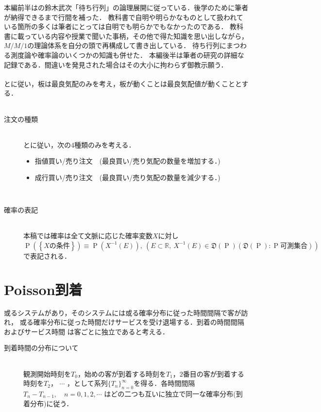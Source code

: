 \documentclass[a4j,papersize,disablejfam,slide,14pt]{jsarticle}
\def\prob#1{\operatorname{P} \left(\left\{ #1 \right\}\right)} %
\begin{document}
    本編前半は\cite{suzuki_queueing}の鈴木武次「待ち行列」の論理展開に従っている．後学のために筆者が納得できるまで行間を補った．
    教科書で自明や明らかなものとして扱われている箇所の多くは筆者にとっては自明でも明らかでもなかったのである．
    教科書に載っている内容や授業で聞いた事柄，その他で得た知識を思い出しながら，$M/M/1$の理論体系を自分の頭で再構成して書き出している．
    待ち行列にまつわる測度論や確率論のいくつかの知識も併せた．
    本編後半は筆者の研究の詳細な記録である．間違いを発見された場合はその大小に拘わらず御教示願う．\\
    \mbox{}\\
    \cite{endo_zuo_kishimoto}と\cite{li_hui_endo_kishimoto}に従い，板は最良気配のみを考え，板が動くことは最良気配値が動くこととする．\\
    \mbox{}\\
    \begin{description}
    	\item[注文の種類]\mbox{}\\
     	\cite{endo_zuo_kishimoto}と\cite{li_hui_endo_kishimoto}に従い，次の4種類のみを考える．
    	\begin{itemize}
    		\item 指値買い/売り注文　(最良買い/売り気配の数量を増加する．)
        	\item 成行買い/売り注文　(最良買い/売り気配の数量を減少する．)
    	\end{itemize}
        \mbox{}\\
        \item[確率の表記]\mbox{}\\
        	本稿では確率は全て文脈に応じた確率変数$X$に対し$\prob{\mbox{$X$の条件}} \equiv \operatorname{P}(X^{-1}(E)),
            \ (E \subset \mathbb{R},\ X^{-1}(E) \in \mathfrak{D}(\operatorname{P})(\mathfrak{D}(\operatorname{P}):\operatorname{P}\mbox{可測集合}))$で表記される．
     \end{description}

\section{{\rm Poisson}到着}
    \begin{screen}
    或るシステムがあり，そのシステムには或る確率分布に従った時間間隔で客が訪れ，
    或る確率分布に従った時間だけサービスを受け退場する．到着の時間間隔およびサービス時間
    は客ごとに独立であると考える．
    \end{screen}
    \begin{description}
    	\item[到着時間の分布について]\mbox{}\\
    	観測開始時刻を$T_0$，始めの客が到着する時刻を$T_1$，$2$番目の客が到着する時刻を$T_2$，
    	$\cdots$ ，として系列$\{T_n\}_{n=0}^{\infty}$を得る．各時間間隔$T_n - T_{n-1},\quad n=0,1,2,\cdots$
    	はどの二つも互いに独立で同一な確率分布(到着分布)に従う．
    \end{description}
\end{document}
